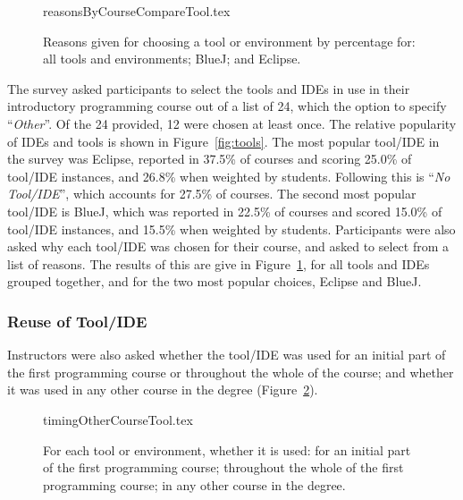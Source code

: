 \documentclass{sig-alternate}
\begin{document}
\begin{figure}[ht]
\begin{center}\vskip-12pt
{reasonsByCourseCompareTool.tex}
\end{center}\vskip-18pt
\caption{Reasons given for choosing a tool or environment by percentage for: all tools and environments; BlueJ; and Eclipse.\label{fig:reasonsTools}}
\end{figure}

The survey asked participants to select the tools and IDEs in use in
their introductory programming course out of a list of 24, which the
option to specify ``{\emph{Other}}''. Of the 24 provided, 12 were
chosen at least once. The relative popularity of IDEs and tools is
shown in Figure~\ref{fig:tools}. The most popular tool/IDE in the
survey was Eclipse, reported in 37.5\% of courses and scoring 25.0\%
of tool/IDE instances, and 26.8\% when weighted by students. Following
this is ``{\emph{No Tool/IDE}}'', which accounts for 27.5\% of
courses. The second most popular tool/IDE is BlueJ, which was reported
in 22.5\% of courses and scored 15.0\% of tool/IDE instances, and
15.5\% when weighted by students. Participants were also asked why
each tool/IDE was chosen for their course, and asked to select from a
list of reasons. The results of this are give in
Figure~\ref{fig:reasonsTools}, for all tools and IDEs grouped
together, and for the two most popular choices, Eclipse and BlueJ.




\subsubsection{Reuse of Tool/IDE}

Instructors were also asked whether the tool/IDE was used for an
initial part of the first programming course or throughout the whole
of the course; and whether it was used in any other course in the
degree (Figure~\ref{fig:toolreuse}). 

\begin{figure}[ht]
\begin{center}
{timingOtherCourseTool.tex}
\end{center}\vskip-18pt
\caption{For each tool or environment, whether it is used: for an initial part of the first programming course; throughout the whole of the first programming course; in any other course in the degree.\label{fig:toolreuse}}
\end{figure}
\end{document}
